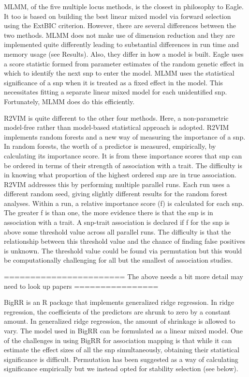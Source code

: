 \documentclass{nature}
\begin{document}
MLMM, of the five multiple locus methods, is the closest in philosophy to Eagle. It too is based on  building the 
best  linear mixed model via forward selection using the ExtBIC criterion. 
However, there are several differences between the two methods.
 MLMM does not make use of dimension reduction and they are implemented quite differently leading to substantial 
 differences  in run time and memory usage (see Results).  Also, they differ in how a model is built. 
 Eagle uses a score statistic formed from parameter estimates of the random genetic effect in which to identify the next snp to enter 
 the model.  MLMM uses the statistical significance of a snp when it is treated as a fixed effect in the model. 
 This necessitates fitting a separate linear mixed model for each unidentified snp. Fortunately,  MLMM does do this 
 efficiently.
 
R2VIM is quite different to the other four methods. Here, a non-parametric model-free rather than model-based statistical approach is adopted. 
R2VIM implements random forests and a new way of measuring the importance of a snp.  
In random forests, the worth of a predictor is measured, empirically, by calculating its importance score. 
It is from these importance scores that snp can be ordered in terms of their strength of association with a trait. 
The difficulty is in knowing what proportion of the 
highest ordered snp are in true association. R2VIM addresses this by performing multiple parallel runs. Each run uses a different 
random seed, giving slightly different results for the random forest analyses. Within a run, a relative importance score (f) is calculated for 
each snp. The greater f is than one, the more evidence there is that the snp is in association with a trait.  A snp-trait association is 
declared if f for the snp is above some threshold value across all parallel runs. The difficulty is that the relationship between 
this threshold value and the chance of finding false positives is unknown.  The threshold value could be found via permutation but 
this would be computationally challenging for all but the smallest of association studies. 


======================= The above needs a bit more detail may need to look up papers ================





BigRR \cite{shen2013novel}  is an R package that implements generalized ridge regression.
In ridge regression, the coefficients of the predictors are shrunk 
to zero by a constant amount.  In generalized ridge regression, the amount of shrinkage is allowed to vary. 
The model used in BigRR can be formulated as a linear mixed model.
One of the challenges in using BigRR for association mapping is that while it can estimate the effect sizes of all the snp simultaneously, 
obtaining their statistical significance is difficult. 
Permutation has been suggested as a way of calculating significance 
empirically \cite{shen2013novel} but we instead opted for stability selection (see below).
\end{document}
